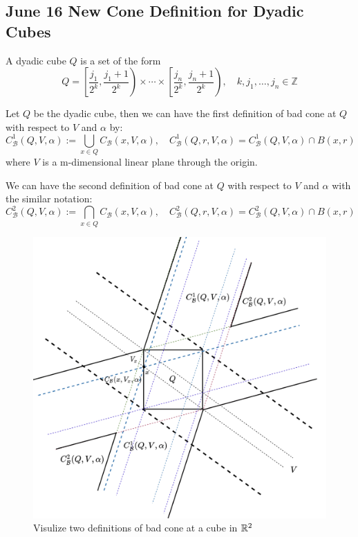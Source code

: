 \newpage
\subsection{June 16 New Cone Definition for Dyadic Cubes}
\begin{definition} A dyadic cube $Q$ is a set of the form
    \begin{equation}\label{eq:dyadiccube}
        Q=\left[\frac{j_{1}}{2^{k}}, \frac{j_{1}+1}{2^{k}}\right) \times \cdots \times\left[\frac{j_{n}}{2^{k}}, \frac{j_{n}+1}{2^{k}}\right), \quad k, j_{1}, \ldots, j_{n} \in \mathbb{Z}
    \end{equation}
\end{definition}

\begin{definition} Let $Q$ be the dyadic cube, then we can have the first definition of bad cone at $Q$ with respect to $V$ and $\alpha$ by:
    $$C^1_{\mathcal{B}}(Q, V, \alpha) := \bigcup_{x\in Q} C_\mathcal{B}(x, V, \alpha), \quad C^1_{\mathcal{B}}(Q, r, V, \alpha) = C^1_{\mathcal{B}}(Q, V, \alpha) \cap B(x,r)$$
    where $V$ is a m-dimensional linear plane through the origin. 
\end{definition}

\begin{definition}
    We can have the second definition of bad cone at $Q$ with respect to $V$ and $\alpha$ with the similar notation:
    $$C^2_{\mathcal{B}}(Q, V, \alpha) := \bigcap_{x\in Q} C_\mathcal{B}(x, V, \alpha), \quad
    C^2_{\mathcal{B}}(Q, r, V, \alpha) = C^2_{\mathcal{B}}(Q, V, \alpha) \cap B(x,r)
    $$
\end{definition}
\begin{figure}[H]
    \centering
    \includegraphics[width=.66\textwidth]{images/cubebadconeDef.png}
    \caption{Visulize two definitions of bad cone at a cube in $\mathbb{R}^2$}
\end{figure}

